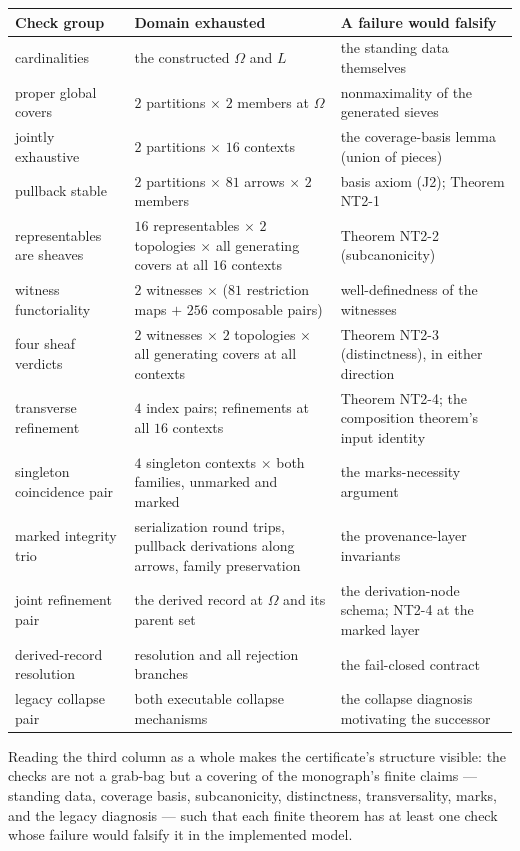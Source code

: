 \begin{longtable}{@{}>{\raggedright\arraybackslash}p{} >{\raggedright\arraybackslash}p{} >{\raggedright\arraybackslash}p{}@{}}
\toprule
Check group & Domain exhausted & A failure would falsify \\
\midrule
\endhead
\bottomrule
\endfoot
cardinalities & the constructed $\Omega$ and $L$ &
the standing data themselves \\
proper global covers & $2$ partitions $\times$ $2$ members at $\Omega$ &
nonmaximality of the generated sieves \\
jointly exhaustive & $2$ partitions $\times$ $16$ contexts &
the coverage-basis lemma (union of pieces) \\
pullback stable & $2$ partitions $\times$ $81$ arrows $\times$ $2$
members & basis axiom (J2); Theorem NT2-1 \\
representables are sheaves & $16$ representables $\times$ $2$ topologies
$\times$ all generating covers at all $16$ contexts &
Theorem NT2-2 (subcanonicity) \\
witness functoriality & $2$ witnesses $\times$ ($81$ restriction maps
$+$ $256$ composable pairs) &
well-definedness of the witnesses \\
four sheaf verdicts & $2$ witnesses $\times$ $2$ topologies $\times$ all
generating covers at all contexts & Theorem NT2-3 (distinctness), in
either direction \\
transverse refinement & $4$ index pairs; refinements at all $16$
contexts & Theorem NT2-4; the composition theorem's input identity \\
singleton coincidence pair & $4$ singleton contexts $\times$ both
families, unmarked and marked & the marks-necessity argument \\
marked integrity trio & serialization round trips, pullback derivations
along arrows, family preservation & the provenance-layer invariants \\
joint refinement pair & the derived record at $\Omega$ and its parent
set & the derivation-node schema; NT2-4 at the marked layer \\
derived-record resolution & resolution and all rejection branches &
the fail-closed contract \\
legacy collapse pair & both executable collapse mechanisms &
the collapse diagnosis motivating the successor \\
\end{longtable}

Reading the third column as a whole makes the certificate's structure
visible: the checks are not a grab-bag but a covering of the monograph's
finite claims --- standing data, coverage basis, subcanonicity,
distinctness, transversality, marks, and the legacy diagnosis --- such
that each finite theorem has at least one check whose failure would
falsify it in the implemented model.

